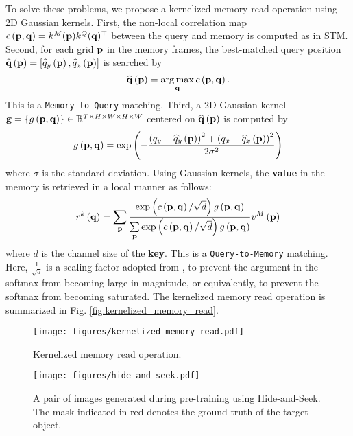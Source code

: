 To solve these problems, we propose a kernelized memory read operation using 2D Gaussian kernels. First, the non-local correlation map $c \left( {\bf{p}} , {\bf{q}} \right) = {{{{k}}^{M}}({\bf{p}})} {k^Q}({\bf{q}})^\top$ between the query and memory is computed as in STM. Second, for each grid $\bf{p}$ in the memory frames, the best-matched query position ${\widehat{\bf{q}}}\left({\bf{p}}\right) = \left[ {{{\widehat q}_y}}\left({\bf{p}}\right), {{{\widehat q}_x}}\left({\bf{p}}\right) \right]$ is searched by
\begin{equation}
\widehat {\bf{q}}\left( {\bf{p}} \right) = \mathop {\arg\max }\limits_{\bf{q}} c\left( {{\bf{p}},{\bf{q}}} \right) .
\label{eq3}
\end{equation}
This is a \texttt{Memory-to-Query} matching. Third, a 2D Gaussian kernel ${\bf{g}} = \left\{g\left({\bf{p}} , {\bf{q}}\right)\right\} \in {\mathbb{R}^{T \times H \times W \times H \times W}}$ centered on $\widehat {\bf{q}}\left( {\bf{p}} \right) $ is computed by
\begin{equation}
g\left( {{\bf{p}},{\bf{q}}} \right) = \exp \left( { - \frac{{{{\left( {{q_y} - {{\widehat q}_y}\left( {\bf{p}} \right)} \right)}^2} + {{\left( {{q_x} - {{\widehat q}_x}\left( {\bf{p}} \right)} \right)}^2}}}{{2{\sigma ^2}}}} \right)
\label{eq4}
\end{equation}
where $\sigma$ is the standard deviation. Using Gaussian kernels, the \textbf{value} in the memory is retrieved in a local manner as follows:
\begin{equation}
{r^k}\left( {\bf{q}} \right) = \sum\limits_{\bf{p}} {\frac{{\exp \left( {c\left( {{\bf{p}},{\bf{q}}} \right)/\sqrt d } \right)g\left( {{\bf{p}},{\bf{q}}} \right)}}{{\sum\limits_{\bf{p}} {\exp \left( {c\left( {{\bf{p}},{\bf{q}}} \right)/\sqrt d } \right)g\left( {{\bf{p}},{\bf{q}}} \right)} }}} {v^M}\left( {\bf{p}} \right)
\label{eq5}
\end{equation}
where $d$ is the channel size of the \textbf{key}. This is a \texttt{Query-to-Memory} matching. Here, $\frac{1}{\sqrt{d}}$ is a scaling factor adopted from \cite{vaswani2017attention}, to prevent the argument in the softmax from becoming large in magnitude, or equivalently, to prevent the softmax from becoming saturated. The kernelized memory read operation is summarized in Fig. \ref{fig:kernelized_memory_read}.

\begin{figure}[t]
\centering
\begin{minipage}[]{0.5\linewidth}
\texttt{[image: figures/kernelized\_memory\_read.pdf]}
\caption{Kernelized memory read operation.}
\label{fig:kernelized_memory_read}
\end{minipage}%
    \hfill%
\begin{minipage}[]{0.45\linewidth}
\texttt{[image: figures/hide-and-seek.pdf]}
\caption{A pair of images generated during pre-training using Hide-and-Seek. The mask indicated in red denotes the ground truth of the target object.}
\label{fig:hide-and-seek}
\end{minipage} 
\end{figure}

